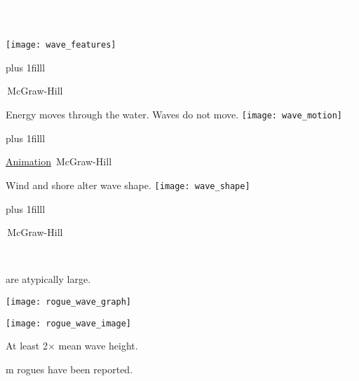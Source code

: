 \documentclass[t]{beamer}
\begin{document}

{
\begin{frame}[b]{\textcolor{white}{Sublittoral ecosystems.}}
\tiny\textcolor{white}{Seafloor Topography V4.0, \textcopyright\,W.H.F. Smith \& D.T. Sandwell, 1996.}
\end{frame}
}

\begin{frame}[t]{}
\texttt{[image: wave\_features]}

\vskip0pt plus 1filll

\tiny\textcopyright\,McGraw-Hill
\end{frame}


\begin{frame}[t]{Energy moves through the water. Waves do not move.}
\texttt{[image: wave\_motion]}

\vskip0pt plus 1filll

\tiny\href{https://fronkonstin.com/2018/12/19/spinning-pins/}{Animation} \hfill \textcopyright\,McGraw-Hill
\end{frame}

\begin{frame}[t]{Wind and shore alter wave shape.}
\texttt{[image: wave\_shape]}

\vskip0pt plus 1filll

\tiny\textcopyright\,McGraw-Hill
\end{frame}

{
\begin{frame}[b]

\tiny\textcolor{white}{2010 Mavericks Competition photo by Shalom Jacobovitz, Wikimedia Commons.}
\end{frame}
}

\begin{frame}[t]{ are atypically large.}
\vspace*{-\baselineskip}
\begin{multicols}{2}

	{\centering\texttt{[image: rogue\_wave\_graph]}

	\texttt{[image: rogue\_wave\_image]}\par}

\columnbreak
	\hangpara At least 2$\times$ mean wave height.
	
	 m rogues have been reported.
	
\end{multicols}
\end{frame}
\end{document}
